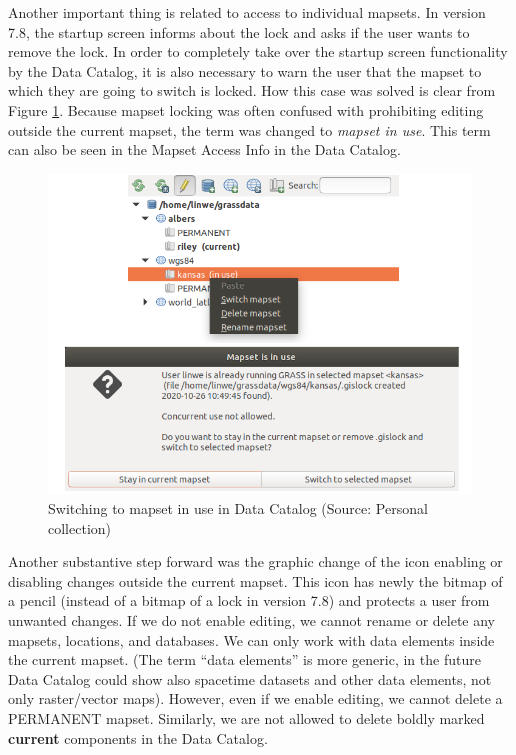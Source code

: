 \documentclass[a4paper,10pt,twoside]{article}
\begin{document}
Another important thing is related to access to individual
mapsets. In version 7.8, the startup screen informs about the lock and
asks if the user wants to remove the lock. In order to completely take
over the startup screen functionality by the Data Catalog, it is also
necessary to warn the user that the mapset to which they are going to
switch is locked. How this case was solved is clear from Figure
\ref{fig:data_catalog_switch_new}. Because mapset locking was often
confused with prohibiting editing outside the current mapset, the term
was changed to \textit{mapset in use}. This term can also be seen in
the Mapset Access Info in the Data Catalog.

\vspace{0.3cm}
\begin{figure}[hbt!] 
\begin{center}
\includegraphics[width=13cm]{../pictures/data_catalog_switch.png} 
\caption[Switching to mapset in use in Data Catalog]{Switching to mapset in use in Data Catalog (Source: Personal collection)}
\label{fig:data_catalog_switch_new}
\end{center}
\end{figure}

\noindent Another substantive step forward was the graphic change of the icon
enabling or disabling changes outside the current mapset. This icon
has newly the bitmap of a pencil (instead of a bitmap of a lock in
version 7.8) and protects a user from unwanted changes. If we do not enable
editing, we cannot rename or delete any mapsets,
locations, and databases. We can only work with data elements inside the
current mapset. (The term ``data elements'' is  more generic, in the
future Data Catalog could show also spacetime datasets and other
data elements, not only raster/vector maps). However, even if we 
enable editing, we cannot delete a PERMANENT mapset. 
Similarly, we are not allowed to delete boldly marked
\textbf{current} components in the Data Catalog.
\end{document}
